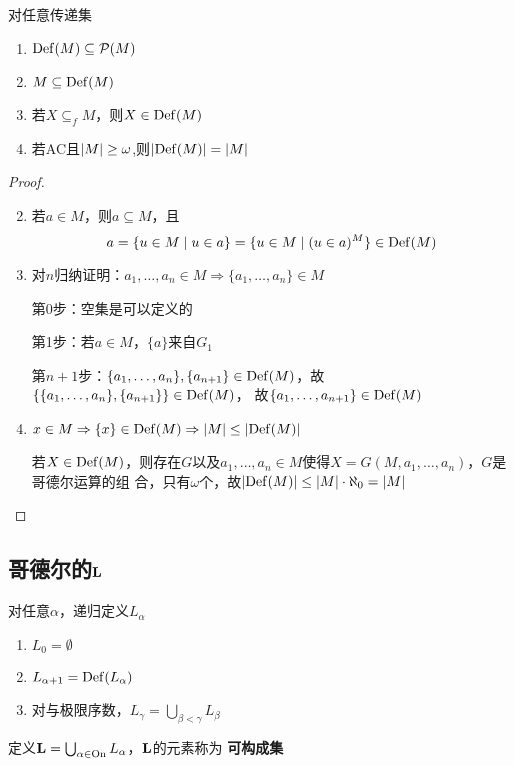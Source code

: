 \documentclass[11pt]{article}
\begin{document}
\begin{lemma}[]
\label{8.1.10}
对任意传递集
\begin{enumerate}
\item \(\operatorname{Def}(M)\subseteq\mathcal{P}(M)\)
\item \(M\subseteq\operatorname{Def}(M)\)
\item 若\(X\subseteq_fM\)，则\(X\in\operatorname{Def}(M)\)
\item 若AC且\(\abs{M}\ge\omega\),则\(\abs{\Def(M)}=\abs{M}\)
\end{enumerate}
\end{lemma}

\begin{proof}
\begin{enumerate}
\setcounter{enumi}{1}
\item 若\(a\in M\)，则\(a\subseteq M\)，且
\begin{equation*}
a=\{u\in M\mid u\in a\}=\{u\in M\mid(u\in a)^M\}\in\operatorname{Def}(M)
\end{equation*}
\item 对\(n\)归纳证明：\(a_1,\dots,a_n\in M\Rightarrow\{a_1,\dots,a_n\}\in M\)

第0步：空集是可以定义的

第1步：若\(a\in M\)，\(\{a\}\)来自\(G_1\)

第\(n+1\)步：\(\{a_1,\dots,a_n\},\{a_{n+1}\}\in\operatorname{Def}(M)\)，故\(\{\{a_1,\dots,a_n\},\{a_{n+1}\}\}\in\operatorname{Def}(M)\)，
故\(\{a_1,\dots,a_{n+1}\}\in\operatorname{Def}(M)\)
\item \(x\in M\Rightarrow\{x\}\in\Def(M)\Rightarrow\abs{M}\le\abs{\Def(M)}\)

若\(X\in\operatorname{Def}(M)\)，则存在\(G\)以及\(a_1,\dots,a_n\in M\)使得\(X=G(M,a_1,\dots,a_n)\)，\(G\)是哥德尔运算的组
合，只有\(\omega\)个，故\(\abs{\Def(M)}\le\abs{M}\cdot\aleph_0=\abs{M}\)
\end{enumerate}
\end{proof}
\subsection{哥德尔的\texorpdfstring{\(\operatorname{\textbf{L}}\)}{L}}
\label{sec:orga43ccc3}
\begin{definition}[]
对任意\(\alpha\)，递归定义\(L_\alpha\)
\begin{enumerate}
\item \(L_0=\emptyset\)
\item \(L_{\alpha+1}=\operatorname{Def}(L_\alpha)\)
\item 对与极限序数，\(L_\gamma=\bigcup_{\beta<\gamma}L_\beta\)
\end{enumerate}


定义\(\operatorname{\textbf{L}}=\bigcup_{\alpha\in\operatorname{On}}L_\alpha\)，\(\operatorname{\textbf{L}}\)的元素称为 \textbf{可构成集}
\end{definition}
\end{document}
